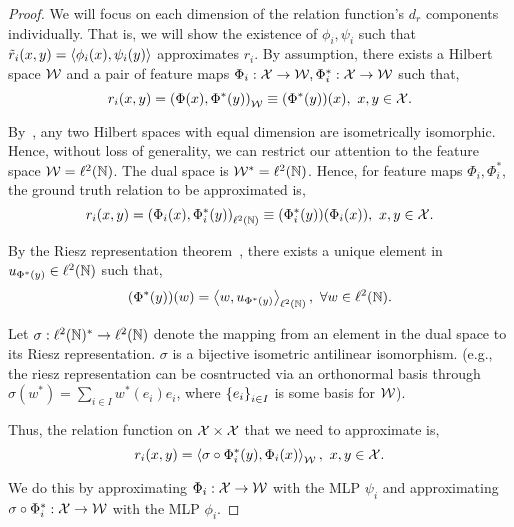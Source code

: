 \begin{proof}
    \hphantom{~}

    We will focus on each dimension of the relation function's $d_r$ components individually. That is, we will show the existence of $\phi_i, \psi_i$ such that $\tilde{r}_i(x, y) = \left \langle \phi_i(x), \psi_i(y) \right\rangle$ approximates $r_i$. By assumption, there exists a Hilbert space ${\mathcal{W}}$ and a pair of feature maps $\Phi_i: {\mathcal{X}} \to {\mathcal{W}}, \Phi_i^*: {\mathcal{X}} \to {\mathcal{W}}$ such that,
    \begin{equation*}
        r_i(x, y) = \left(\Phi(x), \Phi^*(y)\right)_{{\mathcal{W}}} \equiv (\Phi^*(y))(x), \ x, y \in {\mathcal{X}}.
    \end{equation*}

    By~\parencite{}, any two Hilbert spaces with equal dimension are isometrically isomorphic. Hence, without loss of generality, we can restrict our attention to the feature space ${\mathcal{W}} = \ell^2({\mathbb{N}})$. The dual space is ${\mathcal{W}}^* = \ell^2({\mathbb{N}})$. Hence, for feature maps $\Phi_i, \Phi_i^*$, the ground truth relation to be approximated is,
    \begin{equation*}
        r_i(x, y) = \left(\Phi_i(x), \Phi_i^*(y)\right)_{\ell^2({\mathbb{N}})} \equiv (\Phi_i^*(y))(\Phi_i(x)), \ x, y \in {\mathcal{X}}.
    \end{equation*}

    By the Riesz representation theorem~\parencite{riesz_citation}, there exists a unique element in $u_{\Phi^*(y)} \in \ell^2({\mathbb{N}})$ such that,
    \begin{equation*}
        (\Phi^*(y))(w) = \left \langle w, u_{\Phi^*(y)} \right\rangle_{\ell^2({\mathbb{N}})}, \ \forall w \in \ell^2({\mathbb{N}}).
    \end{equation*}

    Let $\sigma: \ell^2({\mathbb{N}})^* \to \ell^2({\mathbb{N}})$ denote the mapping from an element in the dual space to its Riesz representation. $\sigma$ is a bijective isometric antilinear isomorphism. (e.g., the riesz representation can be cosntructed via an orthonormal basis through $\sigma(w^*) = \sum_{i \in I} w^{*}(e_i) e_i$, where $\left\{e_i\right\}_{i \in I}$ is some basis for ${\mathcal{W}}$).

    Thus, the relation function on ${\mathcal{X}} \times {\mathcal{X}}$ that we need to approximate is,
    \begin{equation*}
        r_i(x, y) = \left \langle \sigma \circ \Phi_i^* (y), \Phi_i(x) \right\rangle_{{\mathcal{W}}}, \ x, y \in {\mathcal{X}}.
    \end{equation*}

    We do this by approximating $\Phi_i: {\mathcal{X}} \to {\mathcal{W}}$ with the MLP $\psi_i$ and approximating $\sigma \circ \Phi_i^*: {\mathcal{X}} \to {\mathcal{W}}$ with the MLP $\phi_i$.


\end{proof}
